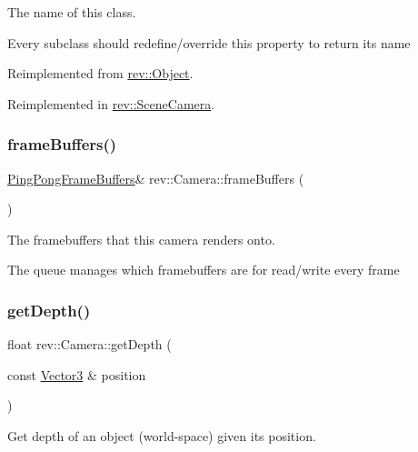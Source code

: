 The name of this class. 

Every subclass should redefine/override this property to return its name 

Reimplemented from \mbox{\hyperlink{classrev_1_1_object_a7a2013f91169479b65cf93afdc5d9a68}{rev\+::\+Object}}.



Reimplemented in \mbox{\hyperlink{classrev_1_1_scene_camera_a4fd93186927c55d2c4d48ebf941e248d}{rev\+::\+Scene\+Camera}}.

\mbox{\label{classrev_1_1_camera_aa594d44b9d0e70e9bf806477ed6ed962}} 
\subsubsection{\texorpdfstring{frameBuffers()}{frameBuffers()}}
{\footnotesize\ttfamily \mbox{\hyperlink{classrev_1_1_frame_buffer_queue}{Ping\+Pong\+Frame\+Buffers}}\& rev\+::\+Camera\+::frame\+Buffers (\begin{DoxyParamCaption}{ }\end{DoxyParamCaption})\hspace{0.3cm}{\ttfamily [inline]}}



The framebuffers that this camera renders onto. 

The queue manages which framebuffers are for read/write every frame \mbox{\label{classrev_1_1_camera_a3b0239e64437defa4469e3b914661ffc}} 
\subsubsection{\texorpdfstring{getDepth()}{getDepth()}}
{\footnotesize\ttfamily float rev\+::\+Camera\+::get\+Depth (\begin{DoxyParamCaption}\item[{const \mbox{\hyperlink{classrev_1_1_vector}{Vector3}} \&}]{position }\end{DoxyParamCaption})\hspace{0.3cm}{\ttfamily [virtual]}}



Get depth of an object (world-\/space) given its position. 

